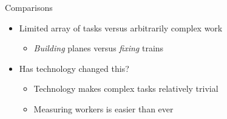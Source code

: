 \documentclass[presentation]{subfiles}
\begin{document}
\begin{frame}
\begin{columns}

  \end{columns}


\end{frame}


\begin{frame}{Comparisons}
\begin{itemize}
  \item Limited array of tasks versus arbitrarily complex work
  \begin{itemize}
    \item \textit{Building} planes versus \textit{fixing} trains
  \end{itemize}
  \item \normalsize{Has technology changed this?}
    \begin{itemize}
      \item Technology makes complex tasks relatively trivial
      \item Measuring workers is easier than ever
    \end{itemize}
\end{itemize}
\end{frame}
\end{document}
